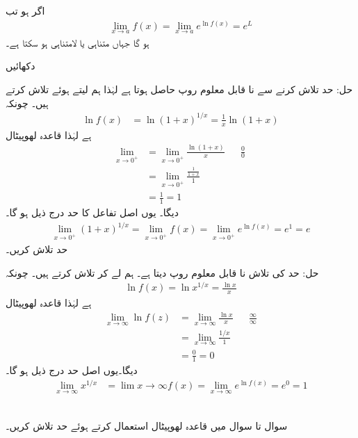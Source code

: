 اگر  ہو تب
\begin{align*}
\lim_{x\to a}f(x)=\lim_{x\to a}e^{\ln f(x)}=e^L
\end{align*}
ہو گا جہاں  متناہی یا لامتناہی ہو سکتا ہے۔ 

دکھائیں 

حل:\quad
حد تلاش کرنے سے نا قابل معلوم روپ  حاصل ہوتا ہے لہٰذا ہم  لیتے ہوئے  تلاش کرتے ہیں۔ چونکہ
\begin{align*}
\ln f(x)&=\ln(1+x)^{1/x}=\frac{1}{x}\ln(1+x)
\end{align*}
ہے لہٰذا قاعدہ لھوپیٹال
\begin{align*}
\lim_{x\to 0^+}&=\lim_{x\to 0^+}\frac{\ln(1+x)}{x}&&\tfrac{0}{0}\\
&=\lim_{x\to 0^+}\frac{\tfrac{1}{1+x}}{1}\\
&=\frac{1}{1}=1
\end{align*}
دیگا۔ یوں اصل تفاعل کا حد درج ذیل ہو گا۔
\begin{align*}
\lim_{x\to 0^+}(1+x)^{1/x}=\lim_{x\to0^+}f(x)=\lim_{x\to 0^+}e^{\ln f(x)}=e^1=e
\end{align*}
حد  تلاش کریں۔

حل:\quad
حد کی تلاش نا قابل معلوم روپ  دیتا ہے۔ ہم  لے کر  تلاش کرتے ہیں۔ چونکہ
\begin{align*}
\ln f(x)=\ln x^{1/x}=\frac{\ln x}{x}
\end{align*}
ہے لہٰذا قاعدہ لھوپیٹال
\begin{align*}
\lim_{x\to\infty}\ln f(z)&=\lim_{x\to\infty}\frac{\ln x}{x}&&\tfrac{\infty}{\infty}\\
&=\lim_{x\to\infty}\frac{1/x}{1}\\
&=\frac{0}{1}=0
\end{align*}
دیگا۔یوں اصل حد درج ذیل ہو گا۔
\begin{align*}
\lim_{x\to\infty}x^{1/x}&=\lim{x\to\infty}f(x)=\lim_{x\to\infty}e^{\ln f(x)}=e^0=1
\end{align*}

\\
سوال  تا سوال  میں قاعدہ لھوپیٹال استعمال کرتے ہوئے حد تلاش کریں۔

